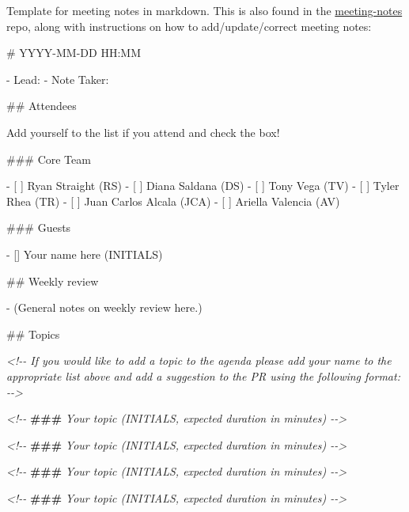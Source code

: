 \documentclass[]{tufte-book}
\newenvironment{Shaded}{}{}
\newcommand{\AlertTok}[1]{\textcolor[rgb]{1.00,0.00,0.00}{\textbf{#1}}}
\newcommand{\CommentTok}[1]{\textcolor[rgb]{0.38,0.63,0.69}{\textit{#1}}}
\newcommand{\FunctionTok}[1]{\textcolor[rgb]{0.02,0.16,0.49}{#1}}
\newcommand{\NormalTok}[1]{#1}
\newcommand{\SpecialStringTok}[1]{\textcolor[rgb]{0.73,0.40,0.53}{#1}}
\newcommand{\VariableTok}[1]{\textcolor[rgb]{0.10,0.09,0.49}{#1}}
\begin{document}
Template for meeting notes in markdown. This is also found in the \href{https://github.com/mavrxlab/meeting-notes}{meeting-notes} repo, along with instructions on how to add/update/correct meeting notes:

\begin{Shaded}
\begin{Highlighting}[]
\FunctionTok{\# YYYY{-}MM{-}DD HH:MM}

\SpecialStringTok{{-} }\NormalTok{Lead:}
\SpecialStringTok{{-} }\NormalTok{Note Taker: }

\FunctionTok{\#\# Attendees}

\NormalTok{Add yourself to the list if you attend and check the box!}

\FunctionTok{\#\#\# Core Team}

\SpecialStringTok{{-} }\VariableTok{[ ]}\NormalTok{ Ryan Straight (RS)}
\SpecialStringTok{{-} }\VariableTok{[ ]}\NormalTok{ Diana Saldana (DS)}
\SpecialStringTok{{-} }\VariableTok{[ ]}\NormalTok{ Tony Vega (TV)}
\SpecialStringTok{{-} }\VariableTok{[ ]}\NormalTok{ Tyler Rhea (TR)}
\SpecialStringTok{{-} }\VariableTok{[ ]}\NormalTok{ Juan Carlos Alcala (JCA)}
\SpecialStringTok{{-} }\VariableTok{[ ]}\NormalTok{ Ariella Valencia (AV)}

\FunctionTok{\#\#\# Guests}

\SpecialStringTok{{-} }\NormalTok{[] Your name here (INITIALS)}

\FunctionTok{\#\# Weekly review}

\SpecialStringTok{{-} }\NormalTok{(General notes on weekly review here.)}

\FunctionTok{\#\# Topics}

\CommentTok{\textless{}!{-}{-} If you would like to add a topic to the agenda please add}
\CommentTok{your name to the appropriate list above and add a suggestion to}
\CommentTok{the PR using the following format: {-}{-}\textgreater{}}

\CommentTok{\textless{}!{-}{-} }\AlertTok{\#\#\#}\CommentTok{ Your topic (INITIALS, expected duration in minutes) {-}{-}\textgreater{}}

\CommentTok{\textless{}!{-}{-} }\AlertTok{\#\#\#}\CommentTok{ Your topic (INITIALS, expected duration in minutes) {-}{-}\textgreater{}}

\CommentTok{\textless{}!{-}{-} }\AlertTok{\#\#\#}\CommentTok{ Your topic (INITIALS, expected duration in minutes) {-}{-}\textgreater{}}

\CommentTok{\textless{}!{-}{-} }\AlertTok{\#\#\#}\CommentTok{ Your topic (INITIALS, expected duration in minutes) {-}{-}\textgreater{}}


\end{Highlighting}
\end{Shaded}
\end{document}
